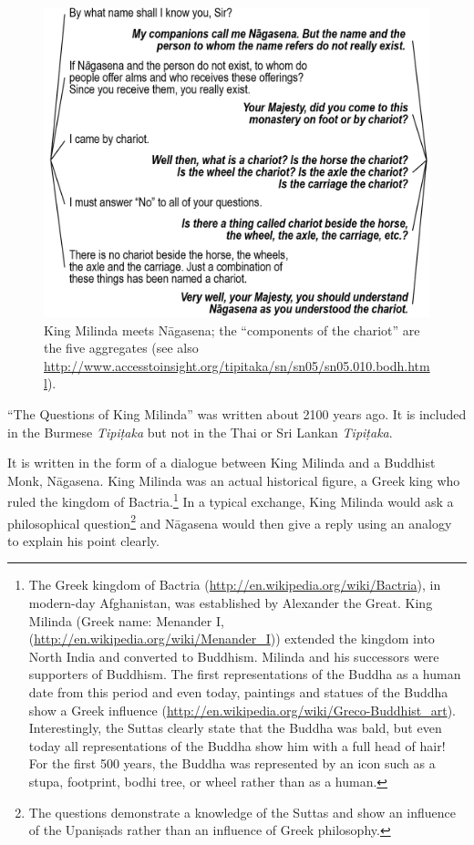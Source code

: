 
\begin{figure}[h]
\centering
\includegraphics[width=0.7\linewidth]{./Diagrams/Milinda}
\caption{King Milinda meets Nāgasena; the “components of the chariot” are the five aggregates (see also \url{http://www.accesstoinsight.org/tipitaka/sn/sn05/sn05.010.bodh.html}). }
\label{fig:Milinda}
\end{figure}

“The Questions of King Milinda” was written about 2100 years ago. It is included in the Burmese \textit{Tipiṭaka} but not in the Thai or Sri Lankan \textit{Tipiṭaka}.

It is written in the form of a dialogue between King Milinda and a Buddhist Monk, Nāgasena. King Milinda was an actual historical figure, a Greek king who ruled the kingdom of Bactria.\footnote{The Greek kingdom of Bactria (\url{http://en.wikipedia.org/wiki/Bactria}), in modern-day Afghanistan, was established by Alexander the Great. King Milinda (Greek name: Menander I, (\url{http://en.wikipedia.org/wiki/Menander_I})) extended the kingdom into North India and converted to Buddhism. Milinda and his successors were supporters of Buddhism. The first representations of the Buddha as a human date from this period and even today, paintings and statues of the Buddha show a Greek influence (\url{http://en.wikipedia.org/wiki/Greco-Buddhist_art}). Interestingly, the Suttas clearly state that the Buddha was bald, but even today all representations of the Buddha show him with a full head of hair! For the first 500 years, the Buddha was represented by an icon such as a stupa, footprint, bodhi tree, or wheel rather than as a human.} In a typical exchange, King Milinda would ask a philosophical question\footnote{The questions demonstrate a knowledge of the Suttas and show an influence of the Upaniṣads rather than an influence of Greek philosophy.} and Nāgasena would then give a reply using an analogy to explain his point clearly. 


